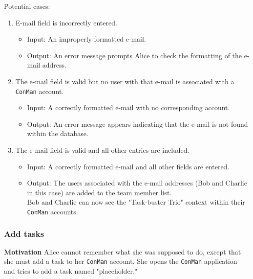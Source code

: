 \documentclass{article}
\begin{document}
Potential cases:
\begin{enumerate}
    \item E-mail field is incorrectly entered.
        \begin{itemize}
            \item Input: An improperly formatted e-mail.
            \item Output: An error message prompts Alice to check the
formatting of the e-mail address.
        \end{itemize}
    \item The e-mail field is valid but no user with that e-mail is associated
with a \texttt{ConMan} account.
        \begin{itemize}
            \item Input: A correctly formatted e-mail with no corresponding
account.
            \item Output: An error message appears indicating that the e-mail
is not found within the database.
        \end{itemize}
    \item The e-mail field is valid and all other entries are included.
        \begin{itemize}
            \item Input: A correctly formatted e-mail and all other fields are
entered.
            \item Output: The users associated with the e-mail addresses (Bob and Charlie in this case) are added to the team member list.\\
                Bob and Charlie can now see the "Task-buster Trio" context within their \texttt{ConMan} accounts.
        \end{itemize}
\end{enumerate}

\subsubsection{Add tasks}
\textbf{Motivation} Alice cannot remember what she was supposed to do, except that she must add a task to her \texttt{ConMan} account.
She opens the \texttt{ConMan} application and tries to add a task named "placeholder."
\end{document}

